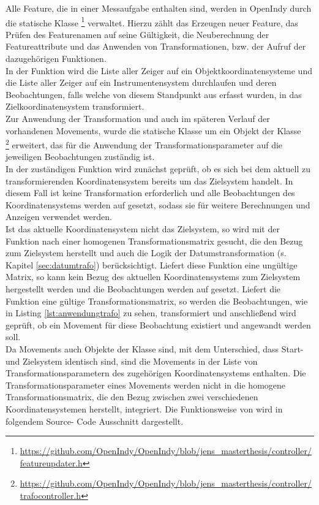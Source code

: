 Alle Feature, die in einer Messaufgabe enthalten sind, werden in OpenIndy durch die statische Klasse \footnote{\url{https://github.com/OpenIndy/OpenIndy/blob/jens_masterthesis/controller/featureupdater.h}} verwaltet. Hierzu zählt das Erzeugen neuer Feature, das Prüfen des Featurenamen auf seine Gültigkeit, die Neuberechnung der Featureattribute und das Anwenden von Transformationen, bzw. der Aufruf  der dazugehörigen Funktionen.\\
In der Funktion \mbox{} wird die Liste aller Zeiger auf ein Objektkoordinatensysteme und die Liste aller Zeiger auf ein Instrumentensystem durchlaufen und deren Beobachtungen, falls welche von diesem Standpunkt aus erfasst wurden, in das Zielkoordinatensystem transformiert.\\
Zur Anwendung der Transformation und auch im späteren Verlauf der vorhandenen Movements, wurde die statische Klasse  um ein Objekt der Klasse \\ \footnote{\url{https://github.com/OpenIndy/OpenIndy/blob/jens_masterthesis/controller/trafocontroller.h}} erweitert, das für die Anwendung der Transformationsparameter auf die jeweiligen Beobachtungen zuständig ist.\\
In der zuständigen Funktion \mbox{} wird zunächst geprüft, ob es sich bei dem aktuell zu transformierenden Koordinatensystem bereits um das Zielsystem handelt. In diesem Fall ist keine Transformation erforderlich und alle Beobachtungen des Koordinatensystems werden auf  gesetzt, sodass sie für weitere Berechnungen und Anzeigen verwendet werden.\\
Ist das aktuelle Koordinatensystem nicht das Zielsystem, so wird mit der Funktion  nach einer homogenen Transformationsmatrix gesucht, die den Bezug zum Zielsystem herstellt und auch die Logik der Datumstransformation (s. Kapitel \ref{sec:datumtrafo}) berücksichtigt. Liefert diese Funktion eine ungültige Matrix, so kann kein Bezug des aktuellen Koordinatensystems zum Zielsystem hergestellt werden und die Beobachtungen werden auf  gesetzt. Liefert die Funktion eine gültige Transformationsmatrix, so werden die Beobachtungen, wie in Listing \ref{lst:anwendungtrafo} zu sehen, transformiert und anschließend wird geprüft, ob ein Movement für diese Beobachtung existiert und angewandt werden soll.\\
Da Movements auch Objekte der Klasse  sind, mit dem Unterschied, dass Start- und Zielsystem identisch sind, sind die Movements in der Liste von Transformationsparametern des zugehörigen Koordinatensystems enthalten. Die Transformationsparameter eines Movements werden nicht in die homogene Transformationsmatrix, die den Bezug zwischen zwei verschiedenen Koordinatensystemen herstellt, integriert. Die Funktionsweise von  wird in folgendem Source- Code Ausschnitt dargestellt.

